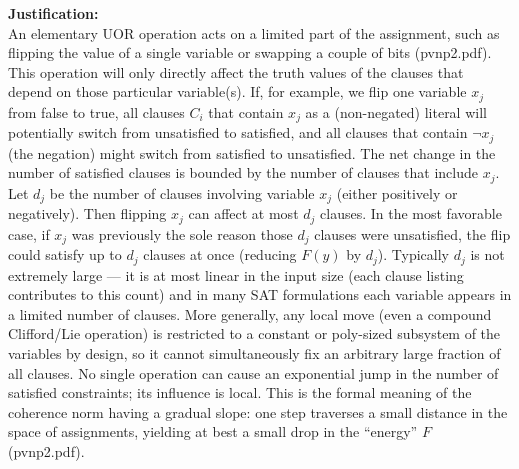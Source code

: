 \documentclass[11pt]{article}
\begin{document}
\textbf{Justification:} \\
An elementary UOR operation acts on a limited part of the assignment, such as flipping the value of a single variable or swapping a couple of bits (pvnp2.pdf). This operation will only directly affect the truth values of the clauses that depend on those particular variable(s). If, for example, we flip one variable \(x_j\) from false to true, all clauses \(C_i\) that contain \(x_j\) as a (non-negated) literal will potentially switch from unsatisfied to satisfied, and all clauses that contain \(\neg x_j\) (the negation) might switch from satisfied to unsatisfied. The net change in the number of satisfied clauses is bounded by the number of clauses that include \(x_j\). Let \(d_j\) be the number of clauses involving variable \(x_j\) (either positively or negatively). Then flipping \(x_j\) can affect at most \(d_j\) clauses. In the most favorable case, if \(x_j\) was previously the sole reason those \(d_j\) clauses were unsatisfied, the flip could satisfy up to \(d_j\) clauses at once (reducing \(F(y)\) by \(d_j\)). Typically \(d_j\) is not extremely large --- it is at most linear in the input size (each clause listing contributes to this count) and in many SAT formulations each variable appears in a limited number of clauses. More generally, any local move (even a compound Clifford/Lie operation) is restricted to a constant or poly-sized subsystem of the variables by design, so it cannot simultaneously fix an arbitrary large fraction of all clauses. No single operation can cause an exponential jump in the number of satisfied constraints; its influence is local. This is the formal meaning of the coherence norm having a gradual slope: one step traverses a small distance in the space of assignments, yielding at best a small drop in the “energy” \(F\) (pvnp2.pdf).
\end{document}
